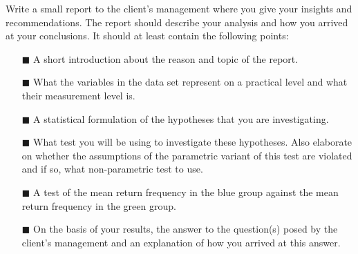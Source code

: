 Write a small report to the client's management where you give your insights and recommendations. The report should describe your analysis and how you arrived at your conclusions. It should at least contain the following points: \\

\begin{itemize}
    \item[$\blacksquare$] A short introduction about the reason and topic of the report.
    \item[$\blacksquare$] What the variables in the data set represent on a practical level and what their measurement level is. 
    \item[$\blacksquare$] A statistical formulation of the hypotheses that you are investigating.
    \item[$\blacksquare$] What test you will be using to investigate these hypotheses. Also elaborate on whether the assumptions of the parametric variant of this test are violated and if so, what non-parametric test to use.
    \item[$\blacksquare$] A test of the mean return frequency in the blue group against the mean return frequency in the green group.
    \item[$\blacksquare$] On the basis of your results, the answer to the question(s) posed by the client's management and an explanation of how you arrived at this answer.
\end{itemize}

\clearpage %